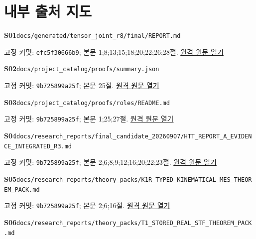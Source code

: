 \documentclass[11pt,a4paper]{article}
\begin{document}
\clearpage\section*{내부 출처 지도}
\hypertarget{src:S01}{}\textbf{S01}\quad \nolinkurl{docs/generated/tensor_joint_r8/final/REPORT.md}\par
{\small 고정 커밋: \texttt{efc5f30666b9}; 본문 1;8;13;15;18;20;22;26;28절. \href{https://github.com/cosmosapjw-quantum/htt_base/blob/efc5f30666b96782f946375551f0068bb3a30f74/docs/generated/tensor_joint_r8/final/REPORT.md}{원격 원문 열기}}\par
\hypertarget{src:S02}{}\textbf{S02}\quad \nolinkurl{docs/project_catalog/proofs/summary.json}\par
{\small 고정 커밋: \texttt{9b725899a25f}; 본문 25절. \href{https://github.com/cosmosapjw-quantum/htt_base/blob/9b725899a25fa410e7c3686ce36afaa667d14646/docs/project_catalog/proofs/summary.json}{원격 원문 열기}}\par
\hypertarget{src:S03}{}\textbf{S03}\quad \nolinkurl{docs/project_catalog/proofs/roles/README.md}\par
{\small 고정 커밋: \texttt{9b725899a25f}; 본문 1;25;27절. \href{https://github.com/cosmosapjw-quantum/htt_base/blob/9b725899a25fa410e7c3686ce36afaa667d14646/docs/project_catalog/proofs/roles/README.md}{원격 원문 열기}}\par
\hypertarget{src:S04}{}\textbf{S04}\quad \nolinkurl{docs/research_reports/final_candidate_20260907/HTT_REPORT_A_EVIDENCE_INTEGRATED_R3.md}\par
{\small 고정 커밋: \texttt{9b725899a25f}; 본문 2;6;8;9;12;16;20;22;23절. \href{https://github.com/cosmosapjw-quantum/htt_base/blob/9b725899a25fa410e7c3686ce36afaa667d14646/docs/research_reports/final_candidate_20260907/HTT_REPORT_A_EVIDENCE_INTEGRATED_R3.md}{원격 원문 열기}}\par
\hypertarget{src:S05}{}\textbf{S05}\quad \nolinkurl{docs/research_reports/theory_packs/K1R_TYPED_KINEMATICAL_MES_THEOREM_PACK.md}\par
{\small 고정 커밋: \texttt{9b725899a25f}; 본문 2;6;16절. \href{https://github.com/cosmosapjw-quantum/htt_base/blob/9b725899a25fa410e7c3686ce36afaa667d14646/docs/research_reports/theory_packs/K1R_TYPED_KINEMATICAL_MES_THEOREM_PACK.md}{원격 원문 열기}}\par
\hypertarget{src:S06}{}\textbf{S06}\quad \nolinkurl{docs/research_reports/theory_packs/T1_STORED_REAL_STF_THEOREM_PACK.md}\par
\end{document}

